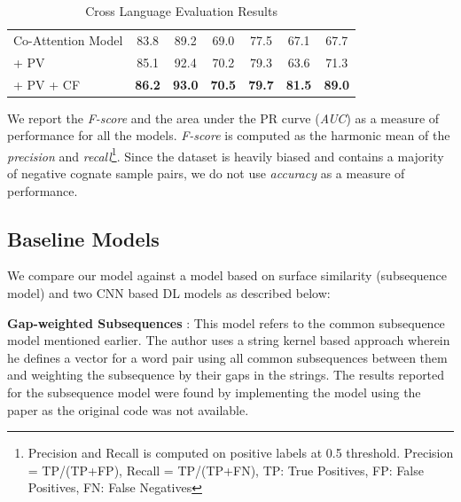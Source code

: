 \documentclass[11pt,letterpaper]{article}
\begin{document}
\begin{table}[t]
\begin{tabular}{|l|cc|cc|cc|}
Co-Attention Model                                  & 83.8                                 & 89.2                             & 69.0                  & 77.5              & 67.1              & 67.7           \\
\quad + PV                                                & 85.1                                 & 92.4                             & 70.2                  & 79.3              & 63.6              & 71.3           \\
\quad + PV + CF                                           & \textbf{86.2}                        & \textbf{93.0}                    & \textbf{70.5}         & \textbf{79.7}     & \textbf{81.5}              & \textbf{89.0} \\ \hline
\end{tabular}
\caption{Cross Language Evaluation Results }
\label{CL_res}
\end{table}

We report the \textit{F-score} and the area under the PR curve (\textit{AUC}) as a measure of performance for all the models. \textit{F-score} is computed as the harmonic mean of the \textit{precision} and \textit{recall}\footnote{Precision and Recall is computed on positive labels at 0.5 threshold. Precision = TP/(TP+FP), Recall = TP/(TP+FN), TP: True Positives, FP: False Positives, FN: False Negatives}. Since the dataset is heavily biased and contains a majority of negative cognate sample pairs, we do not use \textit{accuracy} as a measure of performance.

\subsection{Baseline Models}

We compare our model against a model based on surface similarity (subsequence model) and two CNN based DL models as described below:

\textbf{Gap-weighted Subsequences} : This model refers to the common subsequence model \cite{rama2015automatic} mentioned earlier. The author uses a string kernel based approach wherein he defines a vector for a word pair using all common subsequences between them and weighting the subsequence by their gaps in the strings. The results reported for the subsequence model were found by implementing the model using the paper as the original code was not available.
\end{document}
